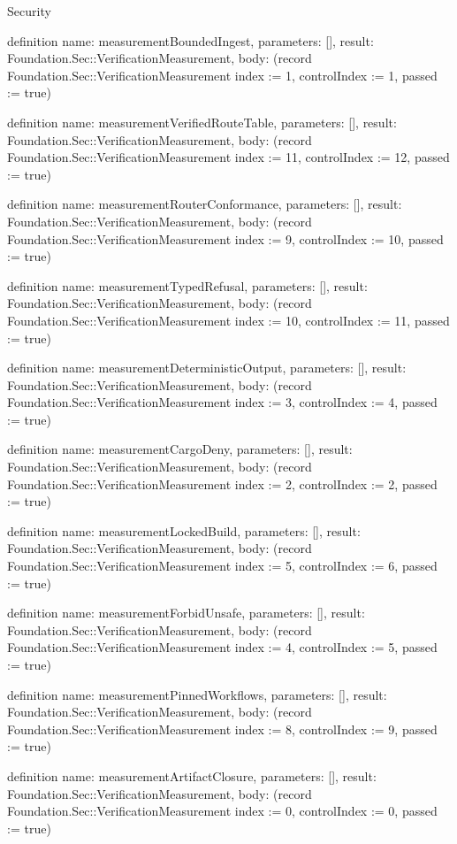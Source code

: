 \begin{lexlean}{Security}
\begin{semanticmodule}
definition{
  name: measurementBoundedIngest,
  parameters: [],
  result: Foundation.Sec::VerificationMeasurement,
  body: (record Foundation.Sec::VerificationMeasurement {index := 1, controlIndex := 1, passed := true})
}

definition{
  name: measurementVerifiedRouteTable,
  parameters: [],
  result: Foundation.Sec::VerificationMeasurement,
  body: (record Foundation.Sec::VerificationMeasurement {index := 11, controlIndex := 12, passed := true})
}

definition{
  name: measurementRouterConformance,
  parameters: [],
  result: Foundation.Sec::VerificationMeasurement,
  body: (record Foundation.Sec::VerificationMeasurement {index := 9, controlIndex := 10, passed := true})
}

definition{
  name: measurementTypedRefusal,
  parameters: [],
  result: Foundation.Sec::VerificationMeasurement,
  body: (record Foundation.Sec::VerificationMeasurement {index := 10, controlIndex := 11, passed := true})
}

definition{
  name: measurementDeterministicOutput,
  parameters: [],
  result: Foundation.Sec::VerificationMeasurement,
  body: (record Foundation.Sec::VerificationMeasurement {index := 3, controlIndex := 4, passed := true})
}

definition{
  name: measurementCargoDeny,
  parameters: [],
  result: Foundation.Sec::VerificationMeasurement,
  body: (record Foundation.Sec::VerificationMeasurement {index := 2, controlIndex := 2, passed := true})
}

definition{
  name: measurementLockedBuild,
  parameters: [],
  result: Foundation.Sec::VerificationMeasurement,
  body: (record Foundation.Sec::VerificationMeasurement {index := 5, controlIndex := 6, passed := true})
}

definition{
  name: measurementForbidUnsafe,
  parameters: [],
  result: Foundation.Sec::VerificationMeasurement,
  body: (record Foundation.Sec::VerificationMeasurement {index := 4, controlIndex := 5, passed := true})
}

definition{
  name: measurementPinnedWorkflows,
  parameters: [],
  result: Foundation.Sec::VerificationMeasurement,
  body: (record Foundation.Sec::VerificationMeasurement {index := 8, controlIndex := 9, passed := true})
}

definition{
  name: measurementArtifactClosure,
  parameters: [],
  result: Foundation.Sec::VerificationMeasurement,
  body: (record Foundation.Sec::VerificationMeasurement {index := 0, controlIndex := 0, passed := true})
}


\end{semanticmodule}
\end{lexlean}
